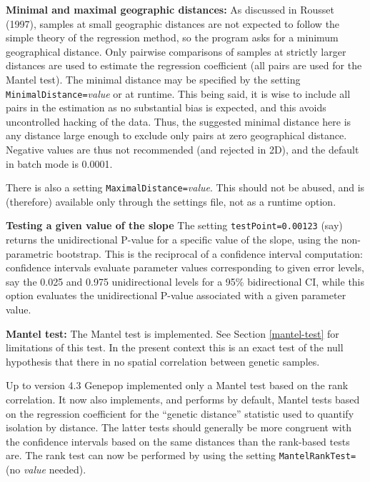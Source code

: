 \documentclass[
  12pt,
]{book}
\begin{document}
\textbf{Minimal and maximal geographic distances:} As discussed in Rousset (1997), samples at small geographic distances are not expected to follow the simple theory of the regression method, so the program asks for a minimum geographical distance. Only pairwise comparisons of samples at strictly larger distances are used to estimate the regression coefficient (all pairs are used for the Mantel test). The minimal distance may be specified by the setting \texttt{MinimalDistance=}\emph{value} or at runtime. This being said, it is wise to include all pairs in the estimation as no substantial bias is expected, and this avoids uncontrolled hacking of the data. Thus, the suggested minimal distance here is any distance large enough to exclude only pairs at zero geographical distance. Negative values are thus not recommended (and rejected in 2D), and the default in batch mode is 0.0001.

There is also a setting \texttt{MaximalDistance=}\emph{value}. This should not be abused, and is (therefore) available only through the settings file, not as a runtime option.

\textbf{Testing a given value of the slope} The setting \texttt{testPoint=0.00123} (say) returns the unidirectional P-value for a specific value of the slope, using the non-parametric bootstrap. This is the reciprocal of a confidence interval computation: confidence intervals evaluate parameter values corresponding to given error levels, say the 0.025 and 0.975 unidirectional levels for a 95\% bidirectional CI, while this option evaluates the unidirectional P-value associated with a given parameter value.

\textbf{Mantel test:} The Mantel test is implemented. See Section \ref{mantel-test} for limitations of this test. In the present context this is an exact test of the null hypothesis that there in no spatial correlation between genetic samples.

Up to version 4.3 Genepop implemented only a Mantel test based on the rank correlation. It now also implements, and performs by default, Mantel tests based on the regression coefficient for the ``genetic distance'' statistic used to quantify isolation by distance. The latter tests should generally be more congruent with the confidence intervals based on the same distances than the rank-based tests are. The rank test can now be performed by using the setting \texttt{MantelRankTest=} (no \emph{value} needed).
\end{document}
